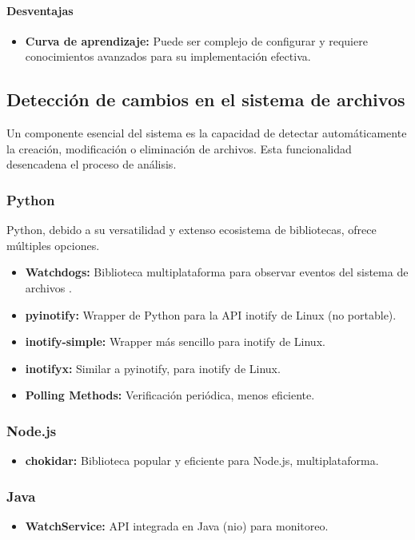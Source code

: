 \paragraph{Desventajas}
\begin{itemize}
    \item \textbf{Curva de aprendizaje:} Puede ser complejo de configurar y requiere conocimientos avanzados para su implementación efectiva.
\end{itemize}

\subsection{Detección de cambios en el sistema de archivos}
Un componente esencial del sistema es la capacidad de detectar automáticamente la creación, modificación o eliminación de archivos. Esta funcionalidad desencadena el proceso de análisis.

\subsubsection{Python}
Python, debido a su versatilidad y extenso ecosistema de bibliotecas, ofrece múltiples opciones.
\begin{itemize}
    \item \textbf{Watchdogs:} Biblioteca multiplataforma para observar eventos del sistema de archivos \cite{noauthor_watchdog_nodate}.
    \item \textbf{pyinotify:} Wrapper de Python para la API inotify de Linux (no portable).
    \item \textbf{inotify-simple:} Wrapper más sencillo para inotify de Linux.
    \item \textbf{inotifyx:} Similar a pyinotify, para inotify de Linux.
    \item \textbf{Polling Methods:} Verificación periódica, menos eficiente.
\end{itemize}

\subsubsection{Node.js}
\begin{itemize}
    \item \textbf{chokidar:} Biblioteca popular y eficiente para Node.js, multiplataforma.
\end{itemize}

\subsubsection{Java}
\begin{itemize}
    \item \textbf{WatchService:} API integrada en Java (\gls{nio}) para monitoreo.
\end{itemize}

